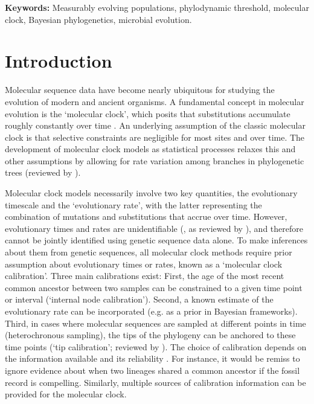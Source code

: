 \documentclass[11pt]{article}
\begin{document}
\textbf{Keywords:} Measurably evolving populations, phylodynamic threshold, molecular clock, Bayesian phylogenetics, microbial evolution.



\section{Introduction}
Molecular sequence data have become nearly ubiquitous for studying the evolution of modern and ancient organisms. A fundamental concept in molecular evolution is the `molecular clock', which posits that substitutions accumulate roughly constantly over time \citep{zuckerkandl1965evolutionary}. An underlying assumption of the classic molecular clock is that selective constraints are negligible for most sites and over time. The development of molecular clock models as statistical processes relaxes this and other assumptions by allowing for rate variation among branches in phylogenetic trees (reviewed by \cite{ho2014molecular, guindon2020rates}).

Molecular clock models necessarily involve two key quantities, the evolutionary timescale and the `evolutionary rate', with the latter representing the combination of mutations and substitutions that accrue over time. However, evolutionary times and rates are unidentifiable (\cite{dos2013unbearable}, as reviewed by \cite{bromham2018bayesian}), and therefore cannot be jointly identified using genetic sequence data alone. To make inferences about them from genetic sequences, all molecular clock methods require prior assumption about evolutionary times or rates, known as a `molecular clock calibration'. Three main calibrations exist: First, the age of the most recent common ancestor between two samples can be constrained to a given time point or interval (`internal node calibration'). Second, a known estimate of the evolutionary rate can be incorporated (e.g. as a prior in Bayesian frameworks). Third, in cases where molecular sequences are sampled at different points in time (heterochronous sampling), the tips of the phylogeny can be anchored to these time points (`tip calibration'; reviewed by \cite{rieux2016inferences}). The choice of calibration depends on the information available and its reliability \citep{warnock2012exploring, duchene2014impact}. For instance, it would be remiss to ignore evidence about when two lineages shared a common ancestor if the fossil record is compelling. Similarly, multiple sources of calibration information can be provided for the molecular clock.
\end{document}
